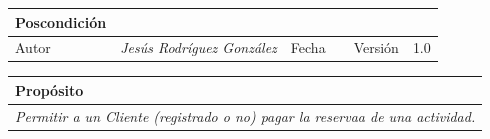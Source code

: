 \begin{table}[H]
\begin{tabular}{llllllll}
        \multicolumn{1}{|l|}{Poscondición}                           & \multicolumn{7}{p{10cm}|}{{\color[HTML]{808080} \textit{}}}                                                                                                                                                                                                                                                       \\ \hline
        \multicolumn{1}{|l|}{Autor}                                  & \multicolumn{1}{l|}{{\color[HTML]{808080} \textit{Jesús Rodríguez González}}}                           & \multicolumn{2}{l|}{Fecha}                                                   & \multicolumn{1}{l|}{}                          & \multicolumn{2}{l|}{Versión}                                                      & \multicolumn{1}{l|}{1.0}                                                     \\ \hline
        \end{tabular}
        \end{table}

        \begin{table}[H]
            \begin{tabular}{llllllll}
        \hline
        \multicolumn{8}{|l|}{\cellcolor[HTML]{F2F2F2}Propósito}                                                                                                                                                                                                                                                                                                                                                                                           \\ \hline
        \multicolumn{8}{|p{15cm}|}{{\color[HTML]{808080} \textit{Permitir a un Cliente (registrado o no) pagar la reservaa de una actividad.}}}                                                                                                                                                                                                             \\ \hline
        \end{tabular}
        \end{table}

